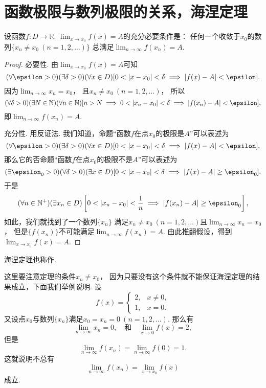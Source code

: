 \section{函数极限与数列极限的关系，海涅定理}
\begin{theorem}[海涅定理]\label{theorem:极限.海涅定理}
设函数\(f\colon D\to\mathbb{R}\).
\(\lim_{x \to x_0} f(x) = A\)的充分必要条件是：
任何一个收敛于\(x_0\)的数列\(\{x_n \neq x_0\ (n=1,2,\dotsc)\}\)
总满足\(\lim_{n\to\infty} f(x_n) = A\).
\begin{proof}
必要性.
由\(\lim_{x \to x_0} f(x) = A\)可知\[
	(\forall\epsilon>0)
	(\exists\delta>0)
	(\forall x\in D)
	[
		0<\abs{x-x_0}<\delta
		\implies
		\abs{f(x)-A}<\epsilon
	].
\]
因为\(\lim_{n\to\infty} x_n = x_0\)，
且\(x_n \neq x_0\ (n=1,2,\dotsc)\)，
所以\[
	(\forall\delta>0)
	(\exists N\in\mathbb{N})
	(\forall n\in\mathbb{N})
	[
		n>N
		\implies
		0<\abs{x_n-x_0}<\delta
		\implies
		\abs{f(x_n)-A}<\epsilon
	],
\]
即\(\lim_{n\to\infty} f(x_n) = A\).

充分性.
用反证法.
我们知道，命题“函数\(f\)在点\(x_0\)的极限是\(A\)”可以表述为\[
	(\forall\epsilon>0)
	(\exists\delta>0)
	(\forall x\in D)
	[
		0<\abs{x-x_0}<\delta
		\implies
		\abs{f(x)-A}<\epsilon
	],
\]
那么它的否命题“函数\(f\)在点\(x_0\)的极限不是\(A\)”可以表述为\[
	(\exists\epsilon_0>0)
	(\forall\delta>0)
	(\exists x\in D)
	[
		0<\abs{x-x_0}<\delta
		\implies
		\abs{f(x)-A}\geq\epsilon_0
	].
\]
于是\[
	(\forall n\in\mathbb{N}^+)
	(\exists x_n\in D)
	\left[
		0<\abs{x_n-x_0}<\frac1n
		\implies
		\abs{f(x_n)-A}\geq\epsilon_0
	\right],
\]
如此，我们就找到了一个数列\(\{x_n\}\)
满足\(x_n\neq x_0\ (n=1,2,\dotsc)\)且\(\lim_{n\to\infty} x_n = x_0\)，
但是\(\{f(x_n)\}\)不可能满足\(\lim_{n\to\infty} f(x_n) = A\).
由此推翻假设，得到\(\lim_{x\to x_0} f(x) = A\).
\end{proof}
\end{theorem}
海涅定理也称作.

这里要注意定理的条件\(x_n \neq x_0\)，
因为只要没有这个条件就不能保证海涅定理的结果成立，下面我们举例说明.
设\[
	f(x) = \left\{ \begin{array}{cl}
		2, & x\neq0, \\
		1, & x=0.
	\end{array} \right.
\]
又设点\(x_0\)与数列\(\{x_n\}\)满足\(x_0=x_n=0\ (n=1,2,\dotsc)\).
那么有\[
	\lim_{n\to\infty} x_n = 0,
	\quad\text{和}\quad
	\lim_{x\to0} f(x) = 2,
\]
但是\[
	\lim_{n\to\infty} f(x_n) = \lim_{n\to\infty} f(0) = 1.
\]这就说明不总有\[
	\lim_{n\to\infty} f(x_n)
	= \lim_{x \to x_0} f(x)
\]成立.

